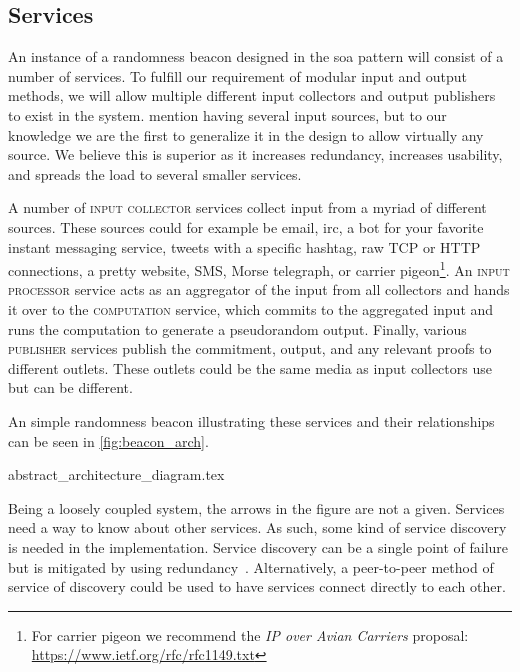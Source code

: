\subsection{Services}%
\label{sub:components_of_a_beacon}

An instance of a randomness beacon designed in the \gls{soa} pattern will consist of a number of services.
To fulfill our requirement of modular input and output methods, we will allow multiple different input collectors and output publishers to exist in the system. \citet{randomzoo} mention having several input sources, but to our knowledge we are the first to generalize it in the design to allow virtually any source. We believe this is superior as it increases redundancy, increases usability, and spreads the load to several smaller services.

A number of \textsc{input collector} services collect input from a myriad of different sources. These sources could for example be email, irc, a bot for your favorite instant messaging service, tweets with a specific hashtag, raw TCP or HTTP connections, a pretty website, SMS, Morse telegraph, or carrier pigeon\footnote{For carrier pigeon we recommend the \emph{IP over Avian Carriers} proposal: \url{https://www.ietf.org/rfc/rfc1149.txt}}.
An \textsc{input processor} service acts as an aggregator of the input from all collectors and hands it over to the \textsc{computation} service, which commits to the aggregated input and runs the computation to generate a pseudorandom output.
Finally, various \textsc{publisher} services publish the commitment, output, and any relevant proofs to different outlets. These outlets could be the same media as input collectors use but can be different.

An simple randomness beacon illustrating these services and their relationships can be seen in \cref{fig:beacon_arch}.

{abstract_architecture_diagram.tex}

Being a loosely coupled system, the arrows in the figure are not a given.
Services need a way to know about other services.
As such, some kind of service discovery is needed in the implementation.
Service discovery can be a single point of failure but is mitigated by using redundancy~\cite{soa_redundancy}.
Alternatively, a peer-to-peer method of service of discovery could be used to have services connect directly to each other.
